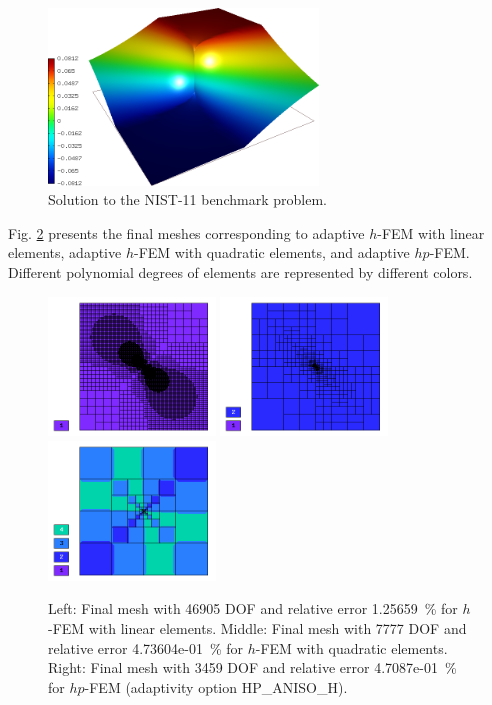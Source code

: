 \documentclass[12pt]{elsarticle}
\begin{document}
\begin{figure}[H]
\centering
\includegraphics[height=4.7cm]{nist/nist-11/solution.png}
\caption{Solution to the NIST-11 benchmark problem.}
\vspace{-3mm}
\label{fig:sln-nist11}
\end{figure}

Fig. \ref{fig:nist-11-hp-aniso} presents the final meshes corresponding to adaptive $h$-FEM with
linear elements, adaptive $h$-FEM with quadratic elements, and adaptive $hp$-FEM. Different
polynomial degrees of elements are represented by different colors.

\begin{figure}[H]
\centering
\includegraphics[height=3.7cm]{nist/nist-11/mesh_h1_aniso.png}
\includegraphics[height=3.7cm]{nist/nist-11/mesh_h2_aniso.png}
\includegraphics[height=3.7cm]{nist/nist-11/mesh_hp_aniso.png}
\vspace{-3mm}
\caption{
Left: Final mesh with 46905 DOF and relative error 1.25659~\% for $h$-FEM with linear elements.
Middle: Final mesh with 7777 DOF and relative error 4.73604e-01~\% for $h$-FEM with quadratic elements.
Right: Final mesh with 3459 DOF and relative error 4.7087e-01~\% for $hp$-FEM (adaptivity option HP\_ANISO\_H).}
\vspace{-2mm}
\label{fig:nist-11-hp-aniso}
\end{figure}
\end{document}
